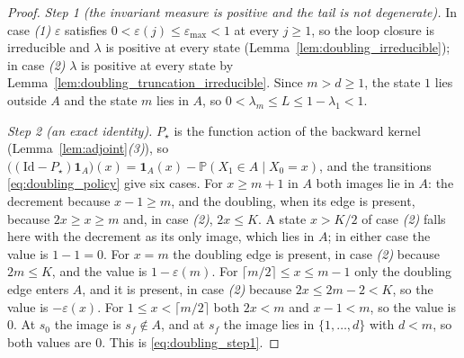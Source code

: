 \begin{proof}
\emph{Step 1 (the invariant measure is positive and the tail is not degenerate).} In case
\emph{(1)} $\varepsilon$ satisfies $0<\varepsilon(j)\leq\varepsilon_{\max}<1$ at every
$j\geq1$, so the loop closure is irreducible and $\lambda$ is positive at every state
(Lemma~\ref{lem:doubling_irreducible}); in case
\emph{(2)} $\lambda$ is positive at every state by
Lemma~\ref{lem:doubling_truncation_irreducible}. Since $m>d\geq1$, the state $1$ lies outside
$A$ and the state $m$ lies in $A$, so $0<\lambda_m\leq L\leq1-\lambda_1<1$.

\emph{Step 2 (an exact identity).} $P_\star$ is the function action of the backward kernel
(Lemma~\ref{lem:adjoint}\emph{(3)}), so
$\bigl((\mathrm{Id}-P_\star)\mathbf 1_A\bigr)(x)=\mathbf 1_A(x)-\mathbb P(X_1\in A\mid X_0=x)$, and the
transitions \eqref{eq:doubling_policy} give six cases. For $x\geq m+1$ in $A$ both images lie
in $A$: the decrement because $x-1\geq m$, and the doubling, when its edge is present, because
$2x\geq x\geq m$ and, in case \emph{(2)}, $2x\leq K$. A state $x>K/2$ of case \emph{(2)} falls
here with the decrement as its only image, which lies in $A$; in either case the value is
$1-1=0$. For $x=m$ the doubling edge is present, in case \emph{(2)} because $2m\leq K$, and
the value is
$1-\varepsilon(m)$. For $\lceil m/2\rceil\leq x\leq m-1$ only the doubling edge enters $A$, and
it is present, in case \emph{(2)} because $2x\leq2m-2<K$, so the value is $-\varepsilon(x)$.
For $1\leq x<\lceil m/2\rceil$ both $2x<m$ and $x-1<m$, so the value is $0$. At $s_0$ the image
is $s_f\notin A$, and at $s_f$ the image lies in $\{1,\dots,d\}$ with $d<m$, so both values are
$0$. This is \eqref{eq:doubling_step1}.


\end{proof}
